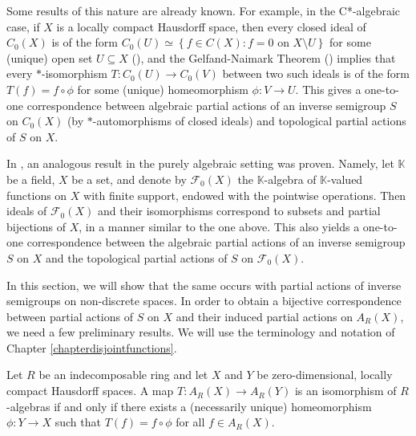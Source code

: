 Some results of this nature are already known. For example, in the C*-algebraic case, if $X$ is a locally compact Hausdorff space, then every closed ideal of $C_0(X)$ is of the form $C_0(U)\simeq\left\{f\in C(X):f=0\text{ on }X\setminus U\right\}$ for some (unique) open set $U\subseteq X$ (\cite[Exercise 3.2.3(5)]{MR1646508}), and the Gelfand-Naimark Theorem (\cite[Theorem 2.1.10]{MR1074574}) implies that every $*$-isomorphism $T:C_0(U)\to C_0(V)$ between two such ideals is of the form $T(f)=f\circ\phi$ for some (unique) homeomorphism $\phi:V\to U$. This gives a one-to-one correspondence between algebraic partial actions of an inverse semigroup $S$ on $C_0(X)$ (by $*$-automorphisms of closed ideals) and topological partial actions of $S$ on $X$.

In \cite{MR3506079}, an analogous result in the purely algebraic setting was proven. Namely, let $\mathbb{K}$ be a field, $X$ be a set, and denote by $\mathcal{F}_0(X)$ the $\mathbb{K}$-algebra of $\mathbb{K}$-valued functions on $X$ with finite support, endowed with the pointwise operations. Then ideals of $\mathcal{F}_0(X)$ and their isomorphisms correspond to subsets and partial bijections of $X$, in a manner similar to the one above. This also yields a one-to-one correspondence between the algebraic partial actions of an inverse semigroup $S$ on $X$ and the topological partial actions of $S$ on $\mathcal{F}_0(X)$. 

In this section, we will show that the same occurs with partial actions of inverse semigroups on non-discrete spaces. %
%
In order to obtain a bijective correspondence between partial actions of $S$ on $X$ and their induced partial actions on $A_R(X)$, we need a few preliminary results. We will use the terminology and notation of Chapter \ref{chapterdisjointfunctions}.

\begin{proposition}\label{prop:isomorp}
Let $R$ be an indecomposable ring and let $X$ and $Y$ be zero-dimensional, locally compact Hausdorff spaces. A map $T:A_R(X) \rightarrow A_R(Y)$ is an isomorphism of $R$-algebras if and only if there exists a (necessarily unique) homeomorphism $\phi:Y\to X$ such that $T(f)=f\circ\phi$ for all $f\in A_R(X)$.
\end{proposition}

